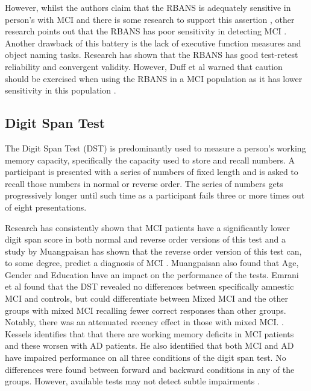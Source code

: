 \documentclass[10pt, letterpaper, twoside, openany]{book}
\begin{document}
However, whilst the authors claim that the RBANS is adequately sensitive in person's with MCI \cite{Randolph1998} and there is some research to support this assertion \cite{Karantzoulis2013}, other research points out that the RBANS has poor sensitivity in detecting MCI \cite{Duff2010}. Another drawback of this battery is the lack of executive function measures and object naming tasks. Research has shown that the RBANS has good test-retest reliability and convergent validity. However, Duff et al warned that caution should be exercised when using the RBANS in a MCI population as it has lower sensitivity in this population \cite{Duff2010}.

\subsection{Digit Span Test}
The Digit Span Test (DST) is predominantly used to measure a person's working memory capacity, specifically the capacity used to store and recall numbers. A participant is presented with a series of numbers of fixed length and is asked to recall those numbers in normal or reverse order. The series of numbers gets progressively longer until such time as a participant fails three or more times out of eight presentations.
\par
Research has consistently shown that MCI patients have a significantly lower digit span score in both normal and reverse order versions of this test and a study by Muangpaisan has shown that the reverse order version of this test can, to some degree, predict a diagnosis of MCI \cite{Muangpaisan2008}. Muangpaisan also found that Age, Gender and Education have an impact on the performance of the tests. Emrani et al found that the DST revealed no differences between specifically amnestic MCI and controls, but could differentiate between Mixed MCI and the other groups with mixed MCI recalling fewer correct responses than other groups. Notably, there was an attenuated recency effect in those with mixed MCI. \cite{Emrani2018}. Kessels identifies that that there are working memory deficits in MCI patients and these worsen with AD patients. \cite{Kessels2011} He also identified that both MCI and AD have impaired performance on all three conditions of the digit span test. No differences were found between forward and backward conditions in any of the groups. However, available tests may not detect subtle impairments \cite{Kessels2015}.
\end{document}
